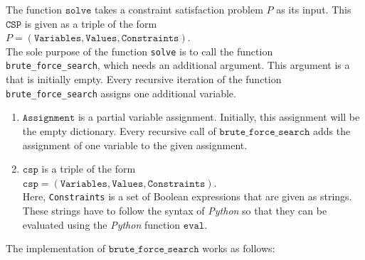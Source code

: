 The function $\texttt{solve}$ takes a constraint satisfaction problem $P$ as its input.  
This $\texttt{CSP}$ is given as a triple of the form  
\\[0.2cm]
\hspace*{1.3cm}
$P = (\texttt{Variables}, \texttt{Values}, \texttt{Constraints})$.
\\[0.2cm]
The sole purpose of the function \texttt{solve} is to call the function \texttt{brute\_force\_search}, which
needs an additional argument.  This argument is a  that is initially empty.  Every
recursive iteration of the function \texttt{brute\_force\_search} assigns one additional variable. 
\begin{enumerate}
\item $\texttt{Assignment}$ is a partial variable assignment.  Initially, this assignment will be the
      empty dictionary.  Every recursive call of $\texttt{brute\_force\_search}$ adds the assignment of one variable to
      the given assignment. 
\item $\texttt{csp}$ is a triple of the form
      \\[0.2cm]
      \hspace*{1.3cm}
      $\texttt{csp} = (\texttt{Variables}, \texttt{Values}, \texttt{Constraints})$.
      \\[0.2cm]
      Here, \texttt{Constraints} is a set of Boolean expressions that are given as strings.  These
      strings have to follow the syntax of \textsl{Python} so that they can be evaluated using the
      \textsl{Python} function $\texttt{eval}$.
\end{enumerate}
The implementation of $\texttt{brute\_force\_search}$ works as follows:
